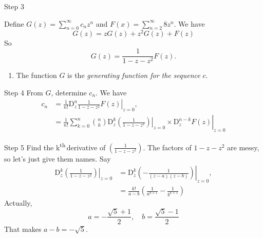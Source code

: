 \documentclass[portrait,fleqn,12pt]{beamer}
\newcommand{\D}{\mathrm{D}}
\newcommand{\kth}{k\textsuperscript{th}\,}
\newenvironment{handlist}
   {\begin{enumerate}[\faHandPointRight]
       \addtolength{\itemsep}{0.0\itemsep}}
     {\end{enumerate}}
\begin{document}
\begin{frame}{Step 3}

Define $G(z) =  \sum_{n=0}^\infty c_{n} z^n$ and $F(x) = \sum_{n=2}^\infty 8 z^n$. We have
\begin{equation}
  G(z) = z G(z) + z^2 G(z) + F(z)
\end{equation}
So 
\begin{equation}
  G(z) = \frac{1}{1-z-z^2} F(z).
\end{equation}

\begin{handlist}
\item The function $G$ is the \emph{generating function for the sequence} $c$.

\end{handlist}


\end{frame}
\begin{frame}{Step 4}
From $G$, determine $c_n$. We have
\begin{align*}
 c_n &= \frac{1}{n!}  \left. \D^n_z  \frac{1}{1-z-z^2} F(z) \right  \vert_{z=0}, \\
       &= \frac{1}{n!}  \left. \left. \sum_{k=0}^n \binom{n}{k} \D^k_z \left( \frac{1}{1-z-z^2} \right)  \right \vert_{z=0} \times \D^{n-k} _z F(z )  \right \vert_{z=0} 
\end{align*}

\end{frame}

\begin{frame}{Step 5}
Find the \kth derivative of $\left( \frac{1}{1-z-z^2} \right) $.   The factors of $1-z-z^2$ are messy, so let's just give them names. Say
\begin{align*}
   \left. \D^k_z \left( \frac{1}{1-z-z^2} \right) \right \vert_{z=0} &=  \left. \D^k_z \left( -\frac{1}{(z-a)(z-b)} \right)  \right \vert_{z=0}, \\
                                                                       &=   \frac{k!}{a-b} \left(\frac{1}{a^{k+1}} - \frac{1}{b^{k+1}} \right)
\end{align*}
Actually,
\[
   a =  -\frac{\sqrt{5}+1}{2}, \quad b = \frac{\sqrt{5}-1}{2}
\]
That makes $a-b = -\sqrt{5}$. 
\end{frame}
\end{document}
